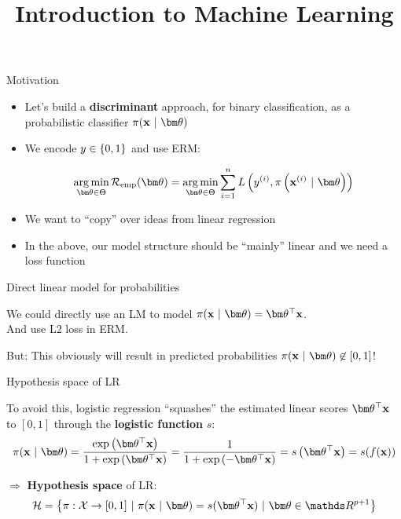 \documentclass[11pt,compress,t,notes=noshow, xcolor=table]{beamer}
\title{Introduction to Machine Learning}
\begin{document}

\begin{vbframe}{Motivation}

\begin{itemize}

\item Let's build a \textbf{discriminant} approach, for binary classification, as a probabilistic classifier $\pixt$

\item We encode $y \in \{0, 1\}$ and use ERM:
  
$$ 
\argmin_{\thetav \in \Theta} \risket = \argmin_{\thetav \in \Theta} \sumin \Lpixyit
$$

\item We want to \enquote{copy} over ideas from linear regression

\item In the above, our model structure should be \enquote{mainly} linear and we need a loss function

\end{itemize}


\end{vbframe}

\begin{vbframe}{Direct linear model for probabilities}

We could directly use an LM to model $\pixt = \thx$.\\
And use L2 loss in ERM.

\lz 


But: This obviously will result in predicted probabilities $\pixt \not\in [0,1]$!

\end{vbframe}

\begin{vbframe}{Hypothesis space of LR}

To avoid this, logistic regression \enquote{squashes} the estimated linear scores $\thx$ to $[0,1]$ through the \textbf{logistic function} $s$:
$$
\pixt = \frac{\exp\left( \thx \right)}{1+\exp\left(\thx \right)} = \frac{1}{1+\exp\left( -\thx \right)} = s\left( \thx \right) = s(\fx)
$$


$\Rightarrow$ \textbf{Hypothesis space} of LR:
$$
  \Hspace = \left\{\pi: \Xspace \to [0,1] ~|~\pixt = s(\thx) ~|~ \thetav \in \R^{p+1} \right\}
$$

\end{vbframe}
\end{document}
